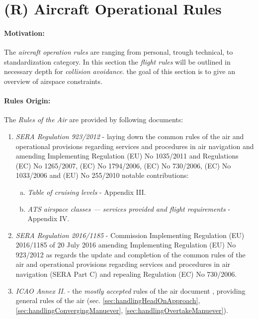 \newpage
\section{(R) Aircraft Operational Rules}\label{sec:AircraftOperationRules}
\paragraph{Motivation:} The \emph{aircraft operation rules} are ranging from personal, trough technical, to standardization category. In this section the \emph{flight rules} will be outlined in necessary depth for \emph{collision avoidance}. the goal of this section is to give an overview of airspace constraints. 

\paragraph{Rules Origin:} The \emph{Rules of the Air} are provided by following documents:

\begin{enumerate}
    \item \emph{SERA Regulation 923/2012} - laying down the common rules of the air and operational provisions regarding services and procedures in air navigation and amending Implementing Regulation (EU) No 1035/2011 and Regulations (EC) No 1265/2007, (EC) No 1794/2006, (EC) No 730/2006, (EC) No 1033/2006 and (EU) No 255/2010 \cite{rulesOfTheFlight2012} notable contributions:
    \begin{enumerate}[a.]
        \item \emph{Table of cruising levels} - Appendix III.
        \item \emph{ATS airspace classes — services provided and flight requirements} - Appendix IV.
    \end{enumerate}
    
    \item \emph{SERA Regulation 2016/1185} - Commission Implementing Regulation (EU) 2016/1185 of 20 July 2016 amending Implementing Regulation (EU) No 923/2012 as regards the update and completion of the common rules of the air and operational provisions regarding services and procedures in air navigation (SERA Part C) and repealing Regulation (EC) No 730/2006.

    \item \emph{ICAO  Annex II.} - the \emph{mostly accepted} rules of the air document \cite{icaoAnnex2}, providing general rules of the air (sec. \ref{sec:handlingHeadOnApproach}, \ref{sec:handlingConvergingManuever}, \ref{sec:handlingOvertakeManuever}).
\end{enumerate}


